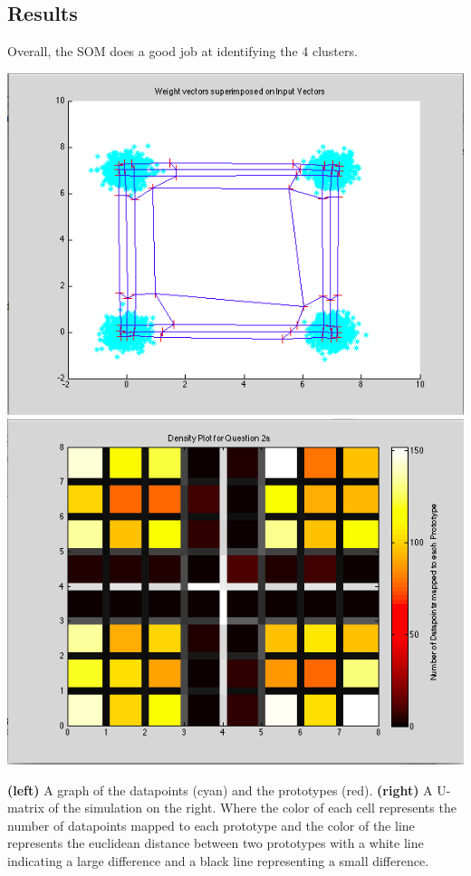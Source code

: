 \documentclass[epsfig]{article}
\begin{document}
\subsection*{Results}
Overall, the SOM does a good job at  identifying the 4 clusters. 
\begin{center}
\includegraphics[scale=0.42]{pic1}
\includegraphics[scale=0.42]{pic2}
\end{center}
\textbf{(left)} A graph of the datapoints (cyan) and the prototypes (red). \textbf{(right)} A U-matrix of the simulation on the right. Where the color of each cell represents the number of datapoints mapped to each prototype and the color of the line represents the euclidean distance between two prototypes with a white line indicating a large difference and a black line representing a small difference.\\
\end{document}

